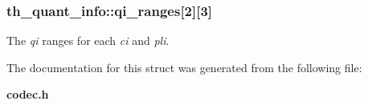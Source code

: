 \subsubsection[{qi\+\_\+ranges}]{ th\+\_\+quant\+\_\+info\+::qi\+\_\+ranges[2][3]}\label{structth__quant__info_a6feacf4b365e305a7df7b93d87ee7bb8}


The {\itshape qi} ranges for each {\itshape ci} and {\itshape pli}. 



The documentation for this struct was generated from the following file\+:\begin{DoxyCompactItemize}
\item 
{\bf codec.\+h}\end{DoxyCompactItemize}
